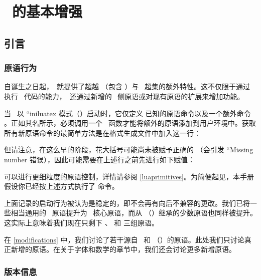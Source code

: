\chapter{\TEX\ 的基本增强}\label{enhancements}

\section{引言}

\subsection{原语行为}

自诞生之日起，\LUATEX\ 就提供了超越 \PDFTEX（包含 \ETEX）与 \ALEPH\ 超集的额外特性。这不仅限于通过  执行 \LUA\ 代码的能力，\LUATEX\ 还通过新增的 \TEX\ 侧原语或对现有原语的扩展来增加功能。

当 \LUATEX\ 以 ``iniluatex 模式（）启动时，它仅定义  已知的原语命令以及一个额外命令 。正如其名所示，必须调用一个 \LUA\ 函数才能将额外的原语添加到用户环境中。获取所有新原语命令的最简单方法是在格式生成文件中加入这一行：

\begin{typing}
\end{typing}

但请注意，在这么早的阶段，花大括号可能尚未被赋予正确的 （会引发 ``Missing number 错误），因此可能需要在上述行之前先进行如下赋值：

\begin{typing}


\end{typing}

可以进行更细粒度的原语控制，详情请参阅 \ref{luaprimitives}。为简便起见，本手册假设你已经按上述方式执行了  命令。

上面记录的启动行为被认为是稳定的，即不会再有向后不兼容的更改。我们已将一些相当通用的 \PDFTEX\ 原语提升为 \LUATEX\ 核心原语，而从 \ALEPH{}（\OMEGA）继承的少数原语也同样被提升。这实际上意味着我们现在只剩下 、 和  三组原语。

在 \ref{modifications} 中，我们讨论了若干源自 \PDFTEX\ 和 \ALEPH{}（\OMEGA）的原语。此处我们只讨论真正新增的原语。在关于字体和数学的章节中，我们还会讨论更多新增原语。

\subsection{版本信息}

